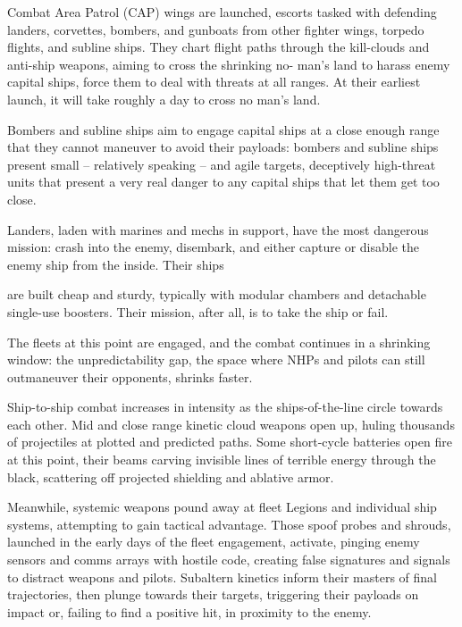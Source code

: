 Combat Area Patrol (CAP) wings are launched, escorts tasked with defending landers, corvettes,  
bombers, and gunboats from other fighter wings, torpedo flights, and subline ships. They chart  
flight paths through the kill-clouds and anti-ship weapons, aiming to cross the shrinking no- 
man’s land to harass enemy capital ships, force them to deal with threats at all ranges. At their  
earliest launch, it will take roughly a day to cross no man’s land. 
 

Bombers and subline ships aim to engage capital ships at a close enough range that they cannot  
maneuver to avoid their payloads: bombers and subline ships present small -- relatively speaking  
-- and agile targets, deceptively high-threat units that present a very real danger to any capital  
ships that let them get too close.
 

Landers, laden with marines and mechs in support, have the most dangerous mission: crash into  
the enemy, disembark, and either capture or disable the enemy ship from the inside. Their ships  

                                                                                                           


are built cheap and sturdy, typically with modular chambers and detachable single-use boosters.  
Their mission, after all, is to take the ship or fail.
 

The fleets at this point are engaged, and the combat continues in a shrinking window: the  
unpredictability gap, the space where NHPs and pilots can still outmaneuver their opponents,  
shrinks faster.
 

Ship-to-ship combat increases in intensity as the ships-of-the-line circle towards each other. Mid  
and close range kinetic cloud weapons open up, huling thousands of projectiles at plotted and  
predicted paths. Some short-cycle batteries open fire at this point, their beams carving invisible  
lines of terrible energy through the black, scattering off projected shielding and ablative armor. 
 

Meanwhile, systemic weapons pound away at fleet Legions and individual ship systems,  
attempting to gain tactical advantage. Those spoof probes and shrouds, launched in the early  
days of the fleet engagement, activate, pinging enemy sensors and comms arrays with hostile  
code, creating false signatures and signals to distract weapons and pilots. Subaltern kinetics  
inform their masters of final trajectories, then plunge towards their targets, triggering their  
payloads on impact or, failing to find a positive hit, in proximity to the enemy.   
 

